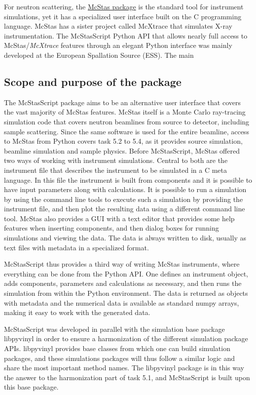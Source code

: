 \documentclass[11pt, a4paper]{article}
\begin{document}
For neutron scattering, the \href{https://www.mcstas.org}{McStas package} is the standard tool for instrument simulations, yet it has a
specialized user interface built on the C programming language. McStas has a
sister project called McXtrace that simulates X-ray instrumentation.
The McStasScript Python API that allows
nearly full access to McStas/\textit{McXtrace} features through an elegant Python
interface was mainly developed at the European Spallation Source (ESS). The main


\subsection{Scope and purpose of the package}
The McStasScript package aims to be an alternative user interface that covers the vast majority of McStas features. McStas itself is a Monte Carlo ray-tracing simulation code that covers neutron beamlines from source to detector, including sample scattering. Since the same software is used for the entire beamline, access to McStas from Python covers task 5.2 to 5.4, as it provides source simulation, beamline simulation and sample physics. Before McStasScript, McStas offered two ways of working with instrument simulations. Central to both are the instrument file that describes the instrument to be simulated in a C meta language. In this file the instrument is built from components and it is possible to have input parameters along with calculations. It is possible to run a simulation by using the command line tools to execute such a simulation by providing the instrument file, and then plot the resulting data using a different command line tool. McStas also provides a GUI with a text editor that provides some help features when inserting components, and then dialog boxes for running simulations and viewing the data. The data is always written to disk, usually as text files with metadata in a specialized format.

McStasScript thus provides a third way of writing McStas instruments, where everything can be done from the Python API. One defines an instrument object, adds components, parameters and calculations as necessary, and then runs the simulation from within the Python environment. The data is returned as objects with metadata and the numerical data is available as standard numpy arrays, making it easy to work with the generated data.

McStasScript was developed in parallel with the simulation base package
libpyvinyl in order to ensure a harmonization of the different simulation
package APIs. libpyvinyl provides base classes from which one can build
simulation packages, and these simulations packages will thus follow a similar
logic and share the most important method names. The libpyvinyl package is in
this way the answer to the harmonization part of task 5.1, and McStasScript is
built upon this base package.
\end{document}
